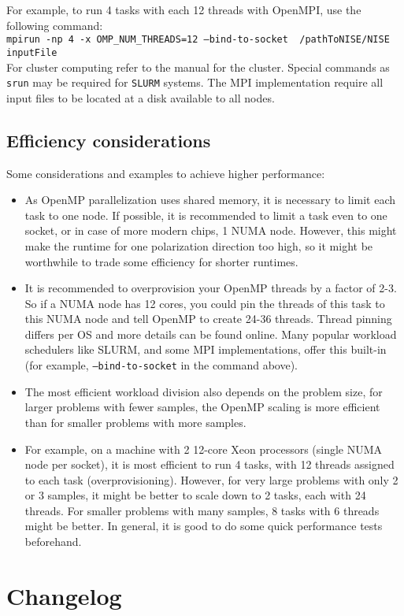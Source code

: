\documentclass[12pt]{book}
\begin{document}
For example, to run 4 tasks with each 12 threads with OpenMPI, use the following command:\\
{\tt mpirun -np 4 -x OMP\_NUM\_THREADS=12 --bind-to-socket ~/pathToNISE/NISE inputFile}\\
For cluster computing refer to the manual for the cluster. Special commands as {\tt srun} may be required for {\tt SLURM} systems. The MPI implementation require all input files to be located at a disk available to all nodes.

\subsection{Efficiency considerations}
Some considerations and examples to achieve higher performance:
\begin{itemize}
\item As OpenMP parallelization uses shared memory, it is necessary to limit each task to one node. If possible, it is recommended to limit a task even to one socket, or in case of more modern chips, 1 NUMA node. However, this might make the runtime for one polarization direction too high, so it might be worthwhile to trade some efficiency for shorter runtimes.
\item It is recommended to overprovision your OpenMP threads by a factor of 2-3. So if a NUMA node has 12 cores, you could pin the threads of this task to this NUMA node and tell OpenMP to create 24-36 threads. Thread pinning differs per OS and more details can be found online. Many popular workload schedulers like SLURM, and some MPI implementations, offer this built-in (for example, {\tt --bind-to-socket} in the command above).
\item The most efficient workload division also depends on the problem size, for larger problems with fewer samples, the OpenMP scaling is more efficient than for smaller problems with more samples.
\item For example, on a machine with 2 12-core Xeon processors (single NUMA node per socket), it is most efficient to run 4 tasks, with 12 threads assigned to each task (overprovisioning). However, for very large problems with only 2 or 3 samples, it might be better to scale down to 2 tasks, each with 24 threads. For smaller problems with many samples, 8 tasks with 6 threads might be better. In general, it is good to do some quick performance tests beforehand.
\end{itemize}

\section{Changelog}
\end{document}
